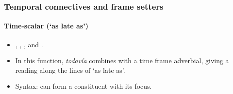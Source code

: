 \subsubsection{Temporal connectives and frame setters}
\paragraph{Time-scalar (\lq as late as\rq{})}
\label{appendixSpanishTodaviaTimeScalar}
\begin{itemize}
	\item \textcite{Bosque2016}, \textcite{EderlyCurco2016}, \textcite{Garrido1993}, \textcite{Martinez1996} and \textcite{Trujillo1990}.
	\item In this function, \textit{todavía} combines with a time frame adverbial, giving a reading along the lines of \lq as late as'.
	\item Syntax: can form a constituent with its focus.
\end{itemize}
